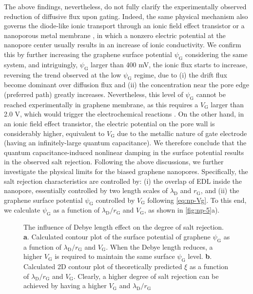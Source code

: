 The above findings, nevertheless, do not fully clarify the
experimentally observed reduction of diffusive flux upon
gating. Indeed, the same physical mechanism also governs the {
  diode-like ionic transport through an ionic field effect transistor
  \cite{Nam_2009_IFET_sub10nm,Lee_2015_sub10nm,Feng_2016_porous_MoS2} or a nanoporous metal membrane
  \cite{Mccurry_2017_electrolyte_porus_gold}}, in which a nonzero electric
potential at the nanopore center usually results in an increase of
ionic conductivity. We confirm this by further increasing the graphene
surface potential $\psi_{\mathrm{G}}$ considering the same system, and intriguingly, $\psi_{\mathrm{G}}$ larger than 400 mV, the ionic flux
starts to increase, reversing the trend observed at the low
$\psi_{\mathrm{G}}$ regime, due to (i) the drift flux become dominant
over diffusion flux and (ii) the concentration near the pore edge
(preferred path) greatly increases.
Nevertheless, this level of $\psi_{\mathrm{G}}$ cannot be
reached experimentally in graphene membrane, as this requires a
$V_{\mathrm{G}}$ larger than 2.0 V, which would trigger the electrochemical
reactions \cite{Toh_2011_GO_electrochem}.
%
On the other hand, in an ionic field effect transistor, the electric
potential on the pore wall is considerably higher, equivalent to
$V_{\mathrm{G}}$ due to the metallic nature of gate electrode (having
an infinitely-large quantum capacitance). We therefore conclude that
the quantum capacitance-induced nonlinear damping in the surface
potential results in the observed salt rejection.  Following the above
discussions, we further investigate the physical limits for the biased
graphene nanopores. Specifically, the salt rejection characteristics
are controlled by: (i) the overlap of EDL inside the nanopore,
essentially controlled by two length scales of $\lambda_{\mathrm{D}}$
and $r_{\mathrm{G}}$, and (ii) the graphene surface potential
$\psi_{\mathrm{G}}$ controlled by $V_{\mathrm{G}}$ following
 \autoref{eq:np-Vg}. To this end, we calculate $\psi_{\mathrm{G}}$ as a
function of $\lambda_{\mathrm{D}} / r_{\mathrm{G}}$ and
$V_{\mathrm{G}}$, as shown in  \autoref{fig:np-5}a).
\begin{figure}[!htbp]
  \centering
  \caption{The influence of Debye length effect on the degree of salt
      rejection. \textbf{a}. Calculated contour plot of the surface
    potential of graphene $\psi_{\mathrm{G}}$ as a function of
    $\lambda_{\mathrm{D}}/r_{\mathrm{G}}$ and $V_{\mathrm{G}}$. When
    the Debye length reduces, a higher $V_{\mathrm{G}}$ is required to
    maintain the same surface $\psi_{\mathrm{G}}$
    level. \textbf{b}. Calculated 2D contour plot of theoretically
    predicted $\xi$ as a function of
    $\lambda_{\mathrm{D}}/r_{\mathrm{G}}$ and
    $V_{\mathrm{G}}$. Clearly, a higher degree of salt rejection can
    be achieved by having a higher $V_{\mathrm{G}}$ and
    $\lambda_{\mathrm{D}}/r_{\mathrm{G}}$}
  \label{fig:np-5}
\end{figure}
